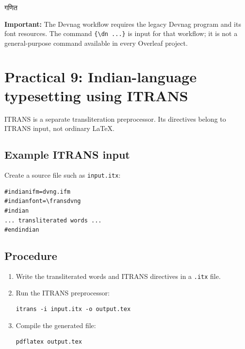 \documentclass[12pt,a4paper]{article}
\begin{document}
\begin{center}
  {\devanagarifont गणित}
\end{center}

\noindent\textbf{Important:} The Devnag workflow requires the legacy Devnag program and its font resources. The command \verb|{\dn ...}| is input for that workflow; it is not a general-purpose command available in every Overleaf project.

\section{Practical 9: Indian-language typesetting using ITRANS}
ITRANS is a separate transliteration preprocessor. Its directives belong to ITRANS input, not ordinary LaTeX.

\subsection{Example ITRANS input}
Create a source file such as \texttt{input.itx}:
\begin{verbatim}
#indianifm=dvng.ifm
#indianfont=\fransdvng
#indian
... transliterated words ...
#endindian
\end{verbatim}

\subsection{Procedure}
\begin{enumerate}
  \item Write the transliterated words and ITRANS directives in a \texttt{.itx} file.
  \item Run the ITRANS preprocessor:
  \begin{verbatim}
itrans -i input.itx -o output.tex
  \end{verbatim}
  \item Compile the generated file:
  \begin{verbatim}
pdflatex output.tex
  \end{verbatim}
\end{enumerate}
\end{document}
